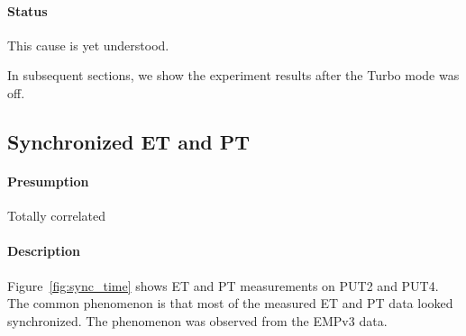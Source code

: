 \documentclass[10pt]{article}
\begin{document}
\paragraph{Status} This cause is yet understood. 

In subsequent sections, we show the experiment results after the Turbo mode was off.

\newpage

\subsection{Synchronized ET and PT}

\paragraph{Presumption} Totally correlated

\paragraph{Description} 
Figure~\ref{fig:sync_time} shows ET and PT measurements on PUT2 and PUT4. 
The common phenomenon is that most of the measured ET and PT data looked synchronized. 
The phenomenon was observed from the EMPv3 data. 
\end{document}
